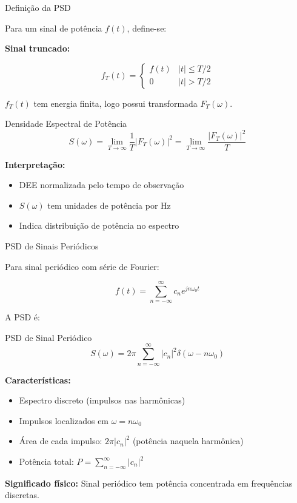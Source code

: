 
\begin{frame}{Definição da PSD}

Para um sinal de potência $f(t)$, define-se:

\textbf{Sinal truncado:}

\[
f_T(t) = \begin{cases}
f(t) & |t| \leq T/2 \\
0 & |t| > T/2
\end{cases}
\]

$f_T(t)$ tem energia finita, logo possui transformada $F_T(\omega)$.

\begin{block}{Densidade Espectral de Potência}
\[
S(\omega) = \lim_{T \to \infty} \frac{1}{T} |F_T(\omega)|^2 = \lim_{T \to \infty} \frac{|F_T(\omega)|^2}{T}
\]
\end{block}

\textbf{Interpretação:}

\begin{itemize}
\item DEE normalizada pelo tempo de observação
\item $S(\omega)$ tem unidades de potência por Hz
\item Indica distribuição de potência no espectro
\end{itemize}

\end{frame}


\begin{frame}{PSD de Sinais Periódicos}

Para sinal periódico com série de Fourier:

\[
f(t) = \sum_{n=-\infty}^{\infty} c_n e^{jn\omega_0 t}
\]

A PSD é:

\begin{block}{PSD de Sinal Periódico}
\[
S(\omega) = 2\pi \sum_{n=-\infty}^{\infty} |c_n|^2 \delta(\omega - n\omega_0)
\]
\end{block}

\textbf{Características:}

\begin{itemize}
\item Espectro discreto (impulsos nas harmônicas)
\item Impulsos localizados em $\omega = n\omega_0$
\item Área de cada impulso: $2\pi|c_n|^2$ (potência naquela harmônica)
\item Potência total: $P = \sum_{n=-\infty}^{\infty} |c_n|^2$
\end{itemize}

\textbf{Significado físico:} Sinal periódico tem potência concentrada em frequências discretas.

\end{frame}

